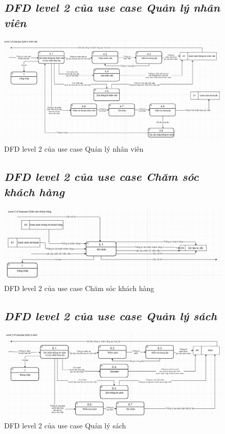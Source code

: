 \documentclass{report}
\begin{document}
\begin{figure}[htp]
    \subsection{\textit{DFD level 2 của use case Quản lý nhân viên}}
    \centering
    \includegraphics[scale = 0.5]{image/DFD_level2_qlnv.PNG}
    \caption{DFD level 2 của use case Quản lý nhân viên}
\end{figure}

\begin{figure}[htp]
    \subsection{\textit{DFD level 2 của use case Chăm sóc khách hàng}}
    \centering
    \includegraphics[scale = 0.6]{image/DFD_level2_cskh.PNG}
    \caption{DFD level 2 của use case Chăm sóc khách hàng}
\end{figure}

\begin{figure}[htp]
    \subsection{\textit{DFD level 2 của use case Quản lý sách}}
    \centering
    \includegraphics[scale = 0.6]{image/DFD_level2_qls.PNG}
    \caption{DFD level 2 của use case Quản lý sách}
\end{figure}
\end{document}
